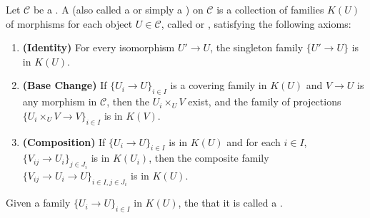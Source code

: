 \begin{definition} \label{definition:basis_and_grothendieck_pretopology_for_a_grothendieck_topology_on_a_category}
Let $\mathcal{C}$ be a .
A  (also called a  or simply a ) on $\mathcal{C}$ is a collection of families $K(U)$ of morphisms for each object $U \in \mathcal{C}$, called  or , satisfying the following axioms:
\begin{enumerate}
    \item \textbf{(Identity)} For every isomorphism $U' \to U$, the singleton family $\{U' \to U\}$ is in $K(U)$.
    \item \textbf{(Base Change)} If $\{U_i \to U\}_{i \in I}$ is a covering family in $K(U)$ and $V \to U$ is any morphism in $\mathcal{C}$, then the  $U_i \times_U V$ exist, and the family of projections $\{U_i \times_U V \to V\}_{i \in I}$ is in $K(V)$.
    \item \textbf{(Composition)} If $\{U_i \to U\}_{i \in I}$ is in $K(U)$ and for each $i \in I$, $\{V_{ij} \to U_i\}_{j \in J_i}$ is in $K(U_i)$, then the composite family $\{V_{ij} \to U_i \to U\}_{i \in I, j \in J_i}$ is in $K(U)$.
\end{enumerate}

Given a family $\{U_i \to U\}_{i \in I}$ in $K(U)$, the  that it  is called a .

\end{definition}